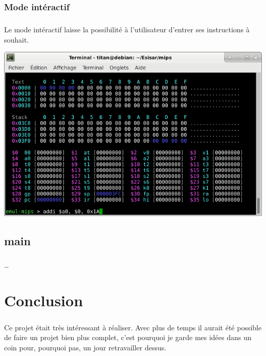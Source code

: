 \documentclass[12pt]{report} %
\begin{document}
    \subsection{Mode intéractif}

    \paragraph{}
    Le mode intéractif laisse la possibilité à l'utilisateur d'entrer ses instructions à souhait.

\begin{center}
    \includegraphics[width=\textwidth]{MIPS-mpEmulator-ModeInteractif.png}
\end{center}

\section{main}

\paragraph{}
\dots

\chapter{Conclusion}

\paragraph{}
Ce projet était très intéressant à réaliser. Avec plus de temps il aurait été possible de faire un projet bien plus complet, c'est pourquoi je garde mes idées dans un coin pour, pourquoi pas, un jour retravailler dessus.
\end{document}
